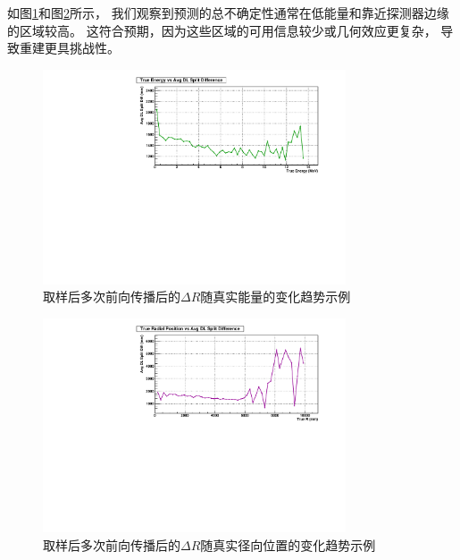 

如图\ref{fig:uq_vs_energy}和图\ref{fig:uq_vs_radius}所示，
我们观察到预测的总不确定性通常在低能量和靠近探测器边缘的区域较高。
这符合预期，因为这些区域的可用信息较少或几何效应更复杂，
导致重建更具挑战性。
\begin{figure}[htbp]
    \centering
    \includegraphics[width=0.8\textwidth]{figures/energy_vs_split_diff_avg.pdf}
    \caption{取样后多次前向传播后的$\Delta R$随真实能量的变化趋势示例}
    \label{fig:uq_vs_energy}
\end{figure}

\begin{figure}[htbp]
    \centering
    \includegraphics[width=0.8\textwidth]{figures/posr_vs_split_diff_avg.pdf}
    \caption{取样后多次前向传播后的$\Delta R$随真实径向位置的变化趋势示例}
    \label{fig:uq_vs_radius}
\end{figure}



